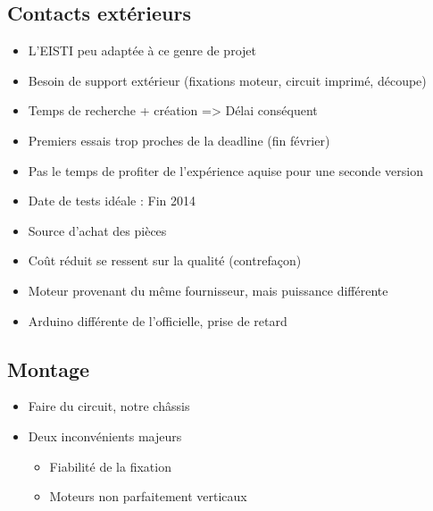 \documentclass{beamer}
\begin{document}
{      \subsection{Contacts extérieurs}
	\begin{frame}
	  \begin{itemize}
	    \item L'EISTI peu adaptée à ce genre de projet
	    \item Besoin de support extérieur (fixations moteur, circuit imprimé, découpe)
	    \item Temps de recherche + création => Délai conséquent
	    \item Premiers essais trop proches de la deadline (fin février)
	    \item Pas le temps de profiter de l'expérience aquise pour une seconde version
	    \item Date de tests idéale : Fin 2014
	  \end{itemize}
	\end{frame}
	
	\begin{frame}
	  \begin{itemize}
	    \item Source d'achat des pièces 
	    \item Coût réduit se ressent sur la qualité (contrefaçon)
	    \item Moteur provenant du même fournisseur, mais puissance différente
	    \item Arduino différente de l'officielle, prise de retard
	  \end{itemize}
	\end{frame}
	
      \subsection{Montage}
	\begin{frame}
	  \begin{itemize}
	    \item Faire du circuit, notre châssis
	    \item Deux inconvénients majeurs
	    \begin{itemize}
	      \item Fiabilité de la fixation
	      \item Moteurs non parfaitement verticaux
	    \end{itemize}
	  \end{itemize}
	\end{frame}

}
\end{document}
